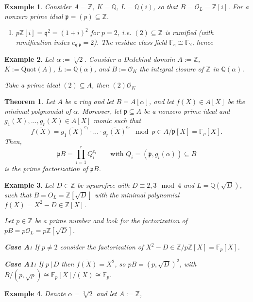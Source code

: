 \documentclass[a4paper]{book}
\theoremstyle{break}
\newtheorem{example}{Example}
\theoremstyle{plain}
\newtheorem{theorem}{Theorem}[definition]
\begin{document}
\begin{example}
    Consider \(A = \mathbb{Z}\), \(K = \mathbb{Q}\), \(L = \mathbb{Q}(i)\), so that \(B = \mathcal{O}_L = \mathbb{Z}[i]\). For a nonzero prime ideal \(\mathfrak{p} = (p) \subseteq \mathbb{Z}\).
    \begin{enumerate}
        \item \(p \mathbb{Z}[i] = \mathfrak{q}^2 = (1 + i)^2\) for \(p = 2\), i.e. \((2) \subseteq \mathbb{Z}\) is ramified (with ramification index \(e_{\mathfrak{q} | \mathfrak{p}} = 2\)). The residue class field \(\mathbb{F}_\mathfrak{q} \cong \mathbb{F}_2\), hence
    \end{enumerate}
\end{example}

\begin{example}
    Let \(\alpha := \sqrt[3]{2}\). Consider a Dedekind domain \(A := \mathbb{Z}\), \(K := \text{Quot}(A)\), \(L := \mathbb{Q}(\alpha)\), and \(B := \mathcal{O}_K\) the integral closure of \(\mathbb{Z}\) in \(\mathbb{Q}(\alpha)\).

    Take a prime ideal \((2) \subseteq A\), then \((2) \mathcal{O}_K\)
\end{example}


\begin{theorem}
    Let \(A\) be a ring and let \(B = A[\alpha]\), and let \(f(X) \in A[X]\) be the minimal polynomial of \(\alpha\). Moreover, let \(\mathfrak{p} \subseteq A\) be a nonzero prime ideal and \(g_1(X), \ldots, g_r(X) \in A[X]\) monic such that
    \begin{equation}
        \overline{f(X)} = \overline{g_1(X)}^{e_1} \cdot \ldots \cdot \overline{g_r(X)}^{e_r} \mod{p} \in A / \mathfrak{p} [X] = \mathbb{F}_p [X] \text{.}
    \end{equation}
    Then,
    \begin{equation}
        \mathfrak{p}B = \prod_{i=1}^r Q_i^{e_i} \qquad \text{with } Q_i = (\mathfrak{p}, g_i(\alpha)) \subseteq B
    \end{equation}
    is the prime factorization of \(\mathfrak{p}B\).
\end{theorem}

\begin{example}
    Let \(D \in \mathbb{Z}\) be squarefree with \(D \equiv 2, 3 \mod{4}\) and \(L = \mathbb{Q}(\sqrt{D})\), such that \(B = O_L = \mathbb{Z}[\sqrt{D}]\) with the minimal polynomial \(f(X) = X^2 - D \in \mathbb{Z}[X]\).

    Let \(p \in \mathbb{Z}\) be a prime number and look for the factorization of \(pB = p \mathcal{O}_L = p \mathbb{Z}[\sqrt{D}]\).

    \noindent \textbf{Case A:} If \(p \neq 2\) consider the factorization of \(X^2 - D \in \mathbb{Z} / p \mathbb{Z} [X] = \mathbb{F}_p [X]\).

    \noindent \textbf{Case A1:} If \(p \, | \, D\) then \(\overline{f(X)} = X^2\), so \(pB = (p, \sqrt{D})^2\), with \(B / (p, \sqrt{p}) \cong \mathbb{F}_p[X]/(X) \cong \mathbb{F}_p\).
\end{example}

\begin{example}
    Denote \(\alpha = \sqrt[3]{2}\) and let \(A := \mathbb{Z}\), 
\end{example}
\end{document}
